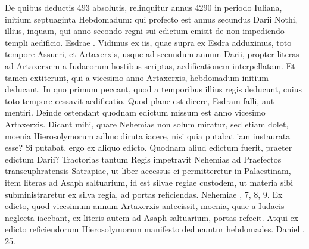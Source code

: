 De quibus deductis 493 absolutis, relinquitur annus 4290 in periodo
Iuliana, initium septuaginta Hebdomadum: qui profecto
est annus secundus Darii Nothi, illius, inquam, qui anno secondo
regni sui edictum emisit de non impediendo templi aedificio.
Esdrae .
Vidimus ex iis, quae supra ex Esdra adduximus, toto tempore
Assueri, et Artaxerxis, usque ad secundum annum Darii, propter
literas ad Artaxerxem a Iudaeorum hostibus scriptas, aedificationem
interpellatam.
Et tamen extiterunt, qui a vicesimo anno
Artaxerxis, hebdomadum initium deducant.
In quo primum
peccant, quod a temporibus illius regis deducunt, cuius toto tempore
cessavit aedificatio.
Quod plane est dicere, Esdram falli, aut mentiri.
Deinde ostendant quodnam edictum missum est anno vicesimo
Artaxerxis.
Dicant mihi, quare Nehemias non solum miratur,
sed etiam dolet, moenia Hierosolymorum adhuc diruta iacere,
nisi quia putabat iam instaurata esse?
Si putabat, ergo ex
aliquo edicto.
Quodnam aliud edictum fuerit, praeter edictum
Darii?
Tractorias tantum Regis impetravit Nehemias ad Praefectos
transeuphratensis Satrapiae, ut liber accessus ei permitteretur
in Palaestinam, item literas ad Asaph saltuarium, id est silvae regiae
custodem, ut materia sibi subministraretur ex silva regia, ad
portas reficiendas.
%
Nehemiae , 7, 8, 9.
Ex edicto, quod vicesimum
annum Artaxerxis antecissit, moenia, quae a Iudaeis neglecta
iacebant, ex literis autem ad Asaph saltuarium, portas refecit.
Atqui ex edicto reficiendorum Hierosolymorum manifesto deducuntur
hebdomades.
Daniel , 25.
